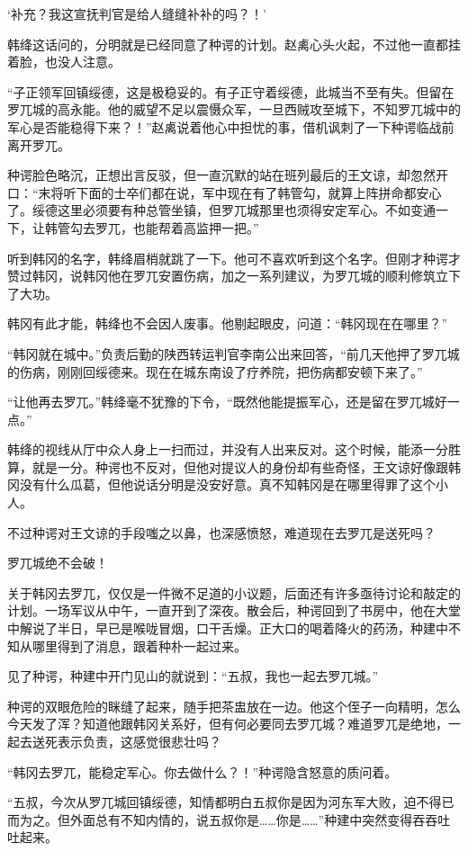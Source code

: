 ‘补充？我这宣抚判官是给人缝缝补补的吗？！’

韩绛这话问的，分明就是已经同意了种谔的计划。赵禼心头火起，不过他一直都挂着脸，也没人注意。

“子正领军回镇绥德，这是极稳妥的。有子正守着绥德，此城当不至有失。但留在罗兀城的高永能。他的威望不足以震慑众军，一旦西贼攻至城下，不知罗兀城中的军心是否能稳得下来？！”赵禼说着他心中担忧的事，借机讽刺了一下种谔临战前离开罗兀。

种谔脸色略沉，正想出言反驳，但一直沉默的站在班列最后的王文谅，却忽然开口：“末将听下面的士卒们都在说，军中现在有了韩管勾，就算上阵拼命都安心了。绥德这里必须要有种总管坐镇，但罗兀城那里也须得安定军心。不如变通一下，让韩管勾去罗兀，也能帮着高监押一把。”

听到韩冈的名字，韩绛眉梢就跳了一下。他可不喜欢听到这个名字。但刚才种谔才赞过韩冈，说韩冈他在罗兀安置伤病，加之一系列建议，为罗兀城的顺利修筑立下了大功。

韩冈有此才能，韩绛也不会因人废事。他剔起眼皮，问道：“韩冈现在在哪里？”

“韩冈就在城中。”负责后勤的陕西转运判官李南公出来回答，“前几天他押了罗兀城的伤病，刚刚回绥德来。现在在城东南设了疗养院，把伤病都安顿下来了。”

“让他再去罗兀。”韩绛毫不犹豫的下令，“既然他能提振军心，还是留在罗兀城好一点。”

韩绛的视线从厅中众人身上一扫而过，并没有人出来反对。这个时候，能添一分胜算，就是一分。种谔也不反对，但他对提议人的身份却有些奇怪，王文谅好像跟韩冈没有什么瓜葛，但他说话分明是没安好意。真不知韩冈是在哪里得罪了这个小人。

不过种谔对王文谅的手段嗤之以鼻，也深感愤怒，难道现在去罗兀是送死吗？

罗兀城绝不会破！

关于韩冈去罗兀，仅仅是一件微不足道的小议题，后面还有许多亟待讨论和敲定的计划。一场军议从中午，一直开到了深夜。散会后，种谔回到了书房中，他在大堂中解说了半日，早已是喉咙冒烟，口干舌燥。正大口的喝着降火的药汤，种建中不知从哪里得到了消息，跟着种朴一起过来。

见了种谔，种建中开门见山的就说到：“五叔，我也一起去罗兀城。”

种谔的双眼危险的眯缝了起来，随手把茶盅放在一边。他这个侄子一向精明，怎么今天发了浑？知道他跟韩冈关系好，但有何必要同去罗兀城？难道罗兀是绝地，一起去送死表示负责，这感觉很悲壮吗？

“韩冈去罗兀，能稳定军心。你去做什么？！”种谔隐含怒意的质问着。

“五叔，今次从罗兀城回镇绥德，知情都明白五叔你是因为河东军大败，迫不得已而为之。但外面总有不知内情的，说五叔你是……你是……”种建中突然变得吞吞吐吐起来。

